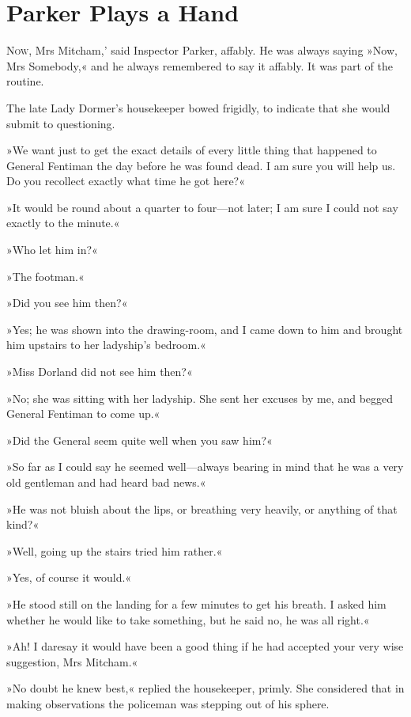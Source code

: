 \chapter{Parker Plays a Hand}

\lettrine[lines=4,ante=‘]{N}{ow}, Mrs Mitcham,' said Inspector Parker, affably. He was always saying »Now, Mrs Somebody,« and he always remembered to say it affably. It was part of the routine.

\zz
The late Lady Dormer's housekeeper bowed frigidly, to indicate that she would submit to questioning.

»We want just to get the exact details of every little thing that happened to General Fentiman the day before he was found dead. I am sure you will help us. Do you recollect exactly what time he got here?«

»It would be round about a quarter to four—not later; I am sure I could not say exactly to the minute.«

»Who let him in?«

»The footman.«

»Did you see him then?«

»Yes; he was shown into the drawing-room, and I came down to him and brought him upstairs to her ladyship's bedroom.«

»Miss Dorland did not see him then?«

»No; she was sitting with her ladyship. She sent her excuses by me, and begged General Fentiman to come up.«

»Did the General seem quite well when you saw him?«

»So far as I could say he seemed well—always bearing in mind that he was a very old gentleman and had heard bad news.«

»He was not bluish about the lips, or breathing very heavily, or anything of that kind?«

»Well, going up the stairs tried him rather.«

»Yes, of course it would.«

»He stood still on the landing for a few minutes to get his breath. I asked him whether he would like to take something, but he said no, he was all right.«

»Ah! I daresay it would have been a good thing if he had accepted your very wise suggestion, Mrs Mitcham.«

»No doubt he knew best,« replied the housekeeper, primly. She considered that in making observations the policeman was stepping out of his sphere.

